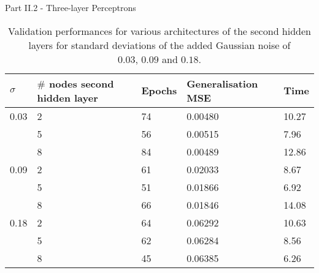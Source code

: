 \documentclass{beamer}
\begin{document}
\begin{frame}{Part II.2 - Three-layer Perceptrons}
    
    \begin{table}[H]
    \footnotesize
    \begin{center}
    \bgroup
    \def\arraystretch{1.5}
    \begin{tabular}{|l|l|l|l|l|} \hline
    $\sigma$ & $\#$ nodes second hidden layer & Epochs & Generalisation MSE & Time\\ \hline
     0.03 & 2 & 74 & 0.00480 & 10.27 \\ \hline
      & 5 & 56 & 0.00515 & 7.96 \\ \hline
      & 8 & 84 & 0.00489 & 12.86 \\ \hline
     0.09 & 2 & 61 & 0.02033 & 8.67 \\ \hline
      & 5 & 51 & 0.01866 & 6.92 \\ \hline
      & 8 & 66 & 0.01846 & 14.08 \\ \hline
     0.18 & 2 & 64 & 0.06292 & 10.63 \\ \hline
      & 5 & 62 & 0.06284 & 8.56 \\ \hline
      & 8 & 45 & 0.06385 & 6.26 \\ \hline
    \end{tabular}
    \end{center}
    \caption{Validation performances for various architectures of the second hidden layers for standard deviations of the added Gaussian noise of \\ $0.03$, $0.09$ and $0.18$.}
    \end{table}
    
\end{frame}
\end{document}
